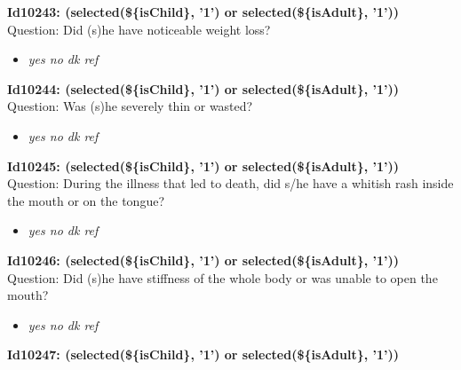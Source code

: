 \documentclass{article}%
\begin{document}
\textbf{Id10243: (selected(\$\{isChild\}, '1') or selected(\$\{isAdult\}, '1'))\newline%
}%
Question: Did (s)he have noticeable weight loss?\newline%
%
\begin{itemize}%
\item%
\textit{yes\newline%
 no\newline%
 dk\newline%
 ref\newline%
}%
\end{itemize}%
\textbf{Id10244: (selected(\$\{isChild\}, '1') or selected(\$\{isAdult\}, '1'))\newline%
}%
Question: Was (s)he severely thin or wasted?\newline%
%
\begin{itemize}%
\item%
\textit{yes\newline%
 no\newline%
 dk\newline%
 ref\newline%
}%
\end{itemize}%
\textbf{Id10245: (selected(\$\{isChild\}, '1') or selected(\$\{isAdult\}, '1'))\newline%
}%
Question: During the illness that led to death, did s/he have a whitish rash inside the mouth or on the tongue?\newline%
%
\begin{itemize}%
\item%
\textit{yes\newline%
 no\newline%
 dk\newline%
 ref\newline%
}%
\end{itemize}%
\textbf{Id10246: (selected(\$\{isChild\}, '1') or selected(\$\{isAdult\}, '1'))\newline%
}%
Question: Did (s)he have stiffness of the whole body or was unable to open the mouth?\newline%
%
\begin{itemize}%
\item%
\textit{yes\newline%
 no\newline%
 dk\newline%
 ref\newline%
}%
\end{itemize}%
\textbf{Id10247: (selected(\$\{isChild\}, '1') or selected(\$\{isAdult\}, '1'))\newline%
}%
\end{document}
